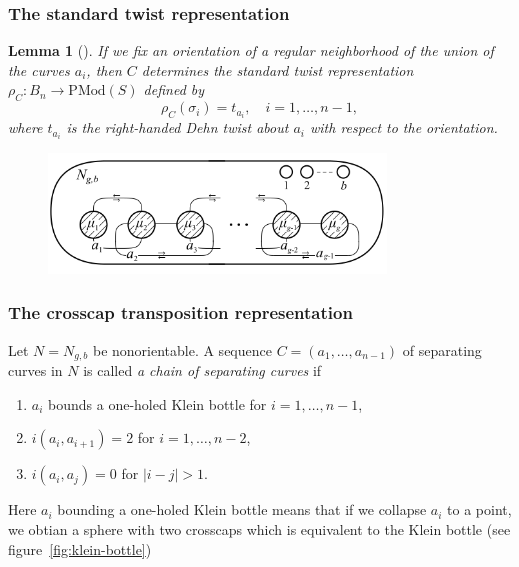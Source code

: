 \documentclass[reqno]{amsart}
\newtheorem{lemma}[theorem]{Lemma}
\theoremstyle{definition}
\theoremstyle{remark}
\newcommand{\PMod}{{\mathrm{PMod}}}
\begin{document}
\subsubsection{The standard twist representation}

\begin{lemma}[]
    If we fix an orientation of a regular neighborhood
    of the union of the curves $a_i$, then
    $C$ determines \textit{the standard twist representation}
    $\rho_{C} \colon B_n \to \PMod (S)$ defined by
    \[
    \rho_C \left( \sigma_i \right) = t_{a_i}, \quad
    i = 1, \ldots, n-1,
    \] 
    where $t_{a_i}$ is the right-handed Dehn twist
    about $a_i$ with respect to the orientation.
\end{lemma}

\begin{figure}[H]
    \centering
    \includegraphics[width=0.8\textwidth]{standard-chain.png}
    \label{fig:standard-chain-png}
\end{figure}


\subsubsection{The crosscap transposition representation}

Let $N = N_{g,b}$ be nonorientable. A sequence
$C = \left( a_1, \ldots, a_{n-1} \right) $ of separating
curves in $N$ is called \textit{a chain of separating curves} if
\begin{enumerate}
    \item $a_i$ bounds a one-holed Klein bottle
        for $i = 1, \ldots, n-1$,
    \item $i \left( a_i, a_{i+1} \right) = 2$ for
        $i = 1,\ldots, n-2$,
    \item $i\left( a_i, a_j \right) = 0$ for
        $\left| i-j \right| > 1$.
\end{enumerate}


Here $a_i$ bounding a one-holed Klein bottle means
that if we collapse $a_i$ to a point, we obtian a 
sphere with two crosscaps which is equivalent to the Klein bottle
(see figure~\ref{fig:klein-bottle})
\end{document}

